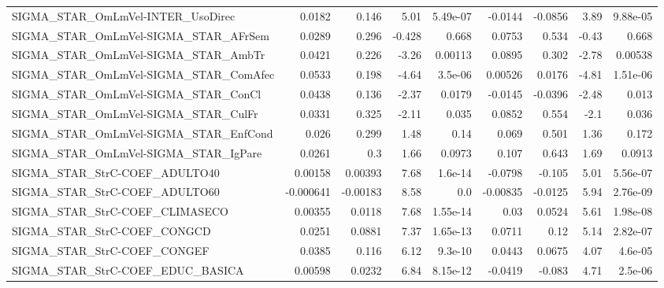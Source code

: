 \begin{tabular}{lrrrrrrrr}
SIGMA\_STAR\_OmLmVel-INTER\_UsoDirec      &      0.0182 &        0.146 &     5.01 & 5.49e-07 &    -0.0144 &     -0.0856 &         3.89 &      9.88e-05 \\
SIGMA\_STAR\_OmLmVel-SIGMA\_STAR\_AFrSem   &      0.0289 &        0.296 &   -0.428 &    0.668 &     0.0753 &       0.534 &        -0.43 &         0.668 \\
SIGMA\_STAR\_OmLmVel-SIGMA\_STAR\_AmbTr    &      0.0421 &        0.226 &    -3.26 &  0.00113 &     0.0895 &       0.302 &        -2.78 &       0.00538 \\
SIGMA\_STAR\_OmLmVel-SIGMA\_STAR\_ComAfec  &      0.0533 &        0.198 &    -4.64 &  3.5e-06 &    0.00526 &      0.0176 &        -4.81 &      1.51e-06 \\
SIGMA\_STAR\_OmLmVel-SIGMA\_STAR\_ConCl    &      0.0438 &        0.136 &    -2.37 &   0.0179 &    -0.0145 &     -0.0396 &        -2.48 &         0.013 \\
SIGMA\_STAR\_OmLmVel-SIGMA\_STAR\_CulFr    &      0.0331 &        0.325 &    -2.11 &    0.035 &     0.0852 &       0.554 &         -2.1 &         0.036 \\
SIGMA\_STAR\_OmLmVel-SIGMA\_STAR\_EnfCond  &       0.026 &        0.299 &     1.48 &     0.14 &      0.069 &       0.501 &         1.36 &         0.172 \\
SIGMA\_STAR\_OmLmVel-SIGMA\_STAR\_IgPare   &      0.0261 &          0.3 &     1.66 &   0.0973 &      0.107 &       0.643 &         1.69 &        0.0913 \\
SIGMA\_STAR\_StrC-COEF\_ADULTO40          &     0.00158 &      0.00393 &     7.68 &  1.6e-14 &    -0.0798 &      -0.105 &         5.01 &      5.56e-07 \\
SIGMA\_STAR\_StrC-COEF\_ADULTO60          &   -0.000641 &     -0.00183 &     8.58 &      0.0 &   -0.00835 &     -0.0125 &         5.94 &      2.76e-09 \\
SIGMA\_STAR\_StrC-COEF\_CLIMASECO         &     0.00355 &       0.0118 &     7.68 & 1.55e-14 &       0.03 &      0.0524 &         5.61 &      1.98e-08 \\
SIGMA\_STAR\_StrC-COEF\_CONGCD            &      0.0251 &       0.0881 &     7.37 & 1.65e-13 &     0.0711 &        0.12 &         5.14 &      2.82e-07 \\
SIGMA\_STAR\_StrC-COEF\_CONGEF            &      0.0385 &        0.116 &     6.12 &  9.3e-10 &     0.0443 &      0.0675 &         4.07 &       4.6e-05 \\
SIGMA\_STAR\_StrC-COEF\_EDUC\_BASICA       &     0.00598 &       0.0232 &     6.84 & 8.15e-12 &    -0.0419 &      -0.083 &         4.71 &       2.5e-06 \\

\end{tabular}

